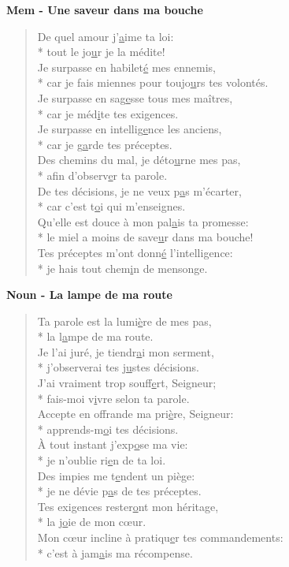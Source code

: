 \textbf{Mem - Une saveur dans ma bouche}
\begin{verse}
De quel amour j’\underline{a}ime ta loi: \\*
tout le jo\underline{u}r je la médite! \\
Je surpasse en habilet\underline{é} mes ennemis, \\*
car je fais miennes pour toujo\underline{u}rs tes volontés. \\
Je surpasse en sag\underline{e}sse tous mes maîtres, \\*
car je méd\underline{i}te tes exigences. \\
Je surpasse en intellig\underline{e}nce les anciens, \\*
car je g\underline{a}rde tes préceptes. \\
Des chemins du mal, je déto\underline{u}rne mes pas, \\*
afin d’observ\underline{e}r ta parole. \\
De tes décisions, je ne veux p\underline{a}s m’écarter, \\*
car c’est t\underline{o}i qui m’enseignes. \\
Qu’elle est douce à mon pal\underline{a}is ta promesse: \\*
le miel a moins de save\underline{u}r dans ma bouche! \\
Tes préceptes m’ont donn\underline{é} l’intelligence: \\*
je hais tout chem\underline{i}n de mensonge. \\
\end{verse}
\textbf{Noun - La lampe de ma route}
\begin{verse}
Ta parole est la lumi\underline{è}re de mes pas, \\*
la l\underline{a}mpe de ma route. \\
Je l’ai juré, je tiendr\underline{a}i mon serment, \\*
j’observerai tes j\underline{u}stes décisions. \\
J’ai vraiment trop souff\underline{e}rt, Seigneur; \\*
fais-moi v\underline{i}vre selon ta parole. \\
Accepte en offrande ma pri\underline{è}re, Seigneur: \\*
apprends-m\underline{o}i tes décisions. \\
À tout instant j’exp\underline{o}se ma vie: \\*
je n’oublie ri\underline{e}n de ta loi. \\
Des impies me t\underline{e}ndent un piège: \\*
je ne dévie p\underline{a}s de tes préceptes. \\
Tes exigences rester\underline{o}nt mon héritage, \\*
la j\underline{o}ie de mon cœur. \\
Mon cœur incline à pratiqu\underline{e}r tes commandements: \\*
c’est à jam\underline{a}is ma récompense. \\
\end{verse}
